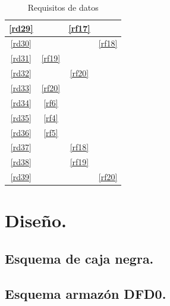 \documentclass[12pt,a4paper]{article}
\begin{document}
\begin{table}[H]
\begin{center}
\begin{tabular}{|c|c|c|c|}
\hline
	\ref{rd29} &  & \ref{rf17} & \\
\hline
	\ref{rd30} &  &  & \ref{rf18} \\
\hline
	\ref{rd31} & \ref{rf19} &  & \\
\hline
	\ref{rd32} &  & \ref{rf20} & \\
\hline
	\ref{rd33} & \ref{rf20} &  & \\
\hline
	\ref{rd34} & \ref{rf6} &  & \\
\hline
	\ref{rd35} & \ref{rf4} &  & \\
\hline
	\ref{rd36} & \ref{rf5} &  & \\
\hline
	\ref{rd37} &  & \ref{rf18} & \\
\hline
	\ref{rd38} &  & \ref{rf19} & \\
\hline
	\ref{rd39} &  & & \ref{rf20} \\
\hline
\end{tabular}
\end{center}
\caption{Requisitos de datos}
\end{table}

\section{Diseño.}
\subsection{Esquema de caja negra.}
  \begin{center}
  \end{center}
\subsection{Esquema armazón DFD0.}
  \begin{center}
  \end{center}
\end{document}
